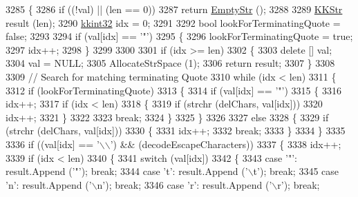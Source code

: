 \begin{DoxyCode}
3285 \{
3286   \textcolor{keywordflow}{if}  ((!val)  ||  (len == 0))
3287     \textcolor{keywordflow}{return}  \hyperlink{class_k_k_b_1_1_k_k_str_ab6e416b3ef54ef632bd10c3f7a2f7994}{EmptyStr} ();
3288 
3289   \hyperlink{class_k_k_b_1_1_k_k_str}{KKStr}  result (len);
3290   \hyperlink{namespace_k_k_b_a8fa4952cc84fda1de4bec1fbdd8d5b1b}{kkint32}  idx = 0;
3291    
3292   \textcolor{keywordtype}{bool}  lookForTerminatingQuote = \textcolor{keyword}{false};
3293 
3294   \textcolor{keywordflow}{if}  (val[idx] == \textcolor{charliteral}{'"'})
3295   \{
3296     lookForTerminatingQuote = \textcolor{keyword}{true};
3297     idx++;
3298   \}
3299 
3300 
3301   \textcolor{keywordflow}{if}  (idx >= len)
3302   \{
3303     \textcolor{keyword}{delete}  [] val;
3304     val = NULL;
3305     AllocateStrSpace (1);
3306     \textcolor{keywordflow}{return}  result;
3307   \}
3308 
3309   \textcolor{comment}{// Search for matching terminating Quote}
3310   \textcolor{keywordflow}{while}  (idx < len)
3311   \{
3312     \textcolor{keywordflow}{if}  (lookForTerminatingQuote)
3313     \{
3314       \textcolor{keywordflow}{if}  (val[idx] == \textcolor{charliteral}{'"'})
3315       \{
3316         idx++;
3317         \textcolor{keywordflow}{if}  (idx < len)
3318         \{
3319           \textcolor{keywordflow}{if}  (strchr (delChars, val[idx]))
3320             idx++;
3321         \}
3322 
3323         \textcolor{keywordflow}{break};
3324       \}
3325     \}
3326 
3327     \textcolor{keywordflow}{else} 
3328     \{
3329       \textcolor{keywordflow}{if}  (strchr (delChars, val[idx]))
3330       \{
3331         idx++;
3332         \textcolor{keywordflow}{break};
3333       \}
3334     \}
3335 
3336     \textcolor{keywordflow}{if}  ((val[idx] == \textcolor{charliteral}{'\(\backslash\)\(\backslash\)'})  &&  (decodeEscapeCharacters))
3337     \{
3338       idx++;
3339       \textcolor{keywordflow}{if}  (idx < len)
3340       \{
3341         \textcolor{keywordflow}{switch}  (val[idx])
3342         \{
3343          \textcolor{keywordflow}{case}  \textcolor{charliteral}{'"'}: result.Append (\textcolor{charliteral}{'"'});      \textcolor{keywordflow}{break};
3344          \textcolor{keywordflow}{case}  \textcolor{charliteral}{'t'}: result.Append (\textcolor{charliteral}{'\(\backslash\)t'});     \textcolor{keywordflow}{break};
3345          \textcolor{keywordflow}{case}  \textcolor{charliteral}{'n'}: result.Append (\textcolor{charliteral}{'\(\backslash\)n'});     \textcolor{keywordflow}{break};
3346          \textcolor{keywordflow}{case}  \textcolor{charliteral}{'r'}: result.Append (\textcolor{charliteral}{'\(\backslash\)r'});     \textcolor{keywordflow}{break};

\end{DoxyCode}

